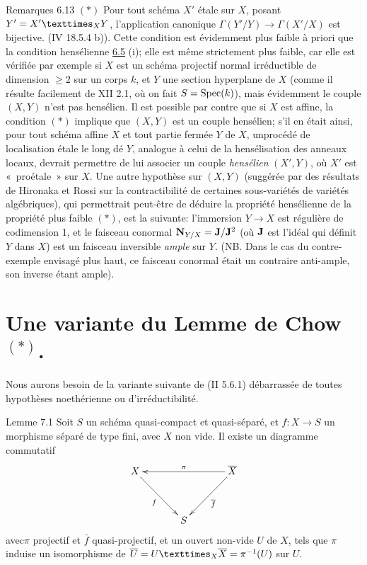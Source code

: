 \documentclass[10pt]{../fichiers-configuration-latex/smfart}
\begin{document}
\begin{enonce*}[remark]{Remarques 6.13}
$(\ast)$ Pour tout schéma $X'$ étale sur $X$, posant
$Y'=\fprod{X'}{Y}{X}$, l'application canonique
$\Gamma(Y'/Y)\rightarrow \Gamma(X'/X)$ est bijective.
(\Cf \EGA IV 18.5.4 b)). Cette condition est évidemment plus faible à
priori que la condition hensélienne \hyperref[XII.prop6.5]{6.5} (i); elle est même strictement
plus faible, car elle est vérifiée par exemple si $X$ est un schéma
projectif normal irréductible de dimension $\geq 2$ sur un corps $k$,
et $Y$ une section hyperplane de $X$ (comme il résulte facilement de
 XII 2.1, où on fait $S=\operatorname{Spec}(k)$), mais évidemment le couple
$(X,Y)$ n'est pas hensélien. Il est possible par contre que si $X$ est
affine, la condition $(\ast)$ implique que $(X,Y)$ est un couple
hensélien; s'il en était ainsi, pour tout schéma affine $X$ et tout
partie fermée $Y$ de $X$, un\pageoriginale procédé de localisation
étale le long dé $Y$, analogue à celui de la hensélisation des anneaux
locaux, devrait permettre de lui associer un couple \emph{hensélien}
$(X',Y)$, où $X'$ est « proétale »  sur $X$. Une autre hypothèse
sur $(X,Y)$ (suggérée par des résultats de Hironaka et Rossi sur la
contractibilité de certaines sous-variétés de variétés algébriques),
qui permettrait peut-être de déduire la propriété hensélienne de la
propriété plus faible $(\ast)$, est la suivante: l'immersion
$Y\rightarrow X$ est régulière de codimension 1, et le faisceau
conormal $\mathbf{N}_{Y/X}=\mathbf{J}/\mathbf{J}^2$ (où $\mathbf{J}$ est l'idéal qui définit $Y$
dans $X$) est un faisceau inversible \emph{ample} sur $Y$. (NB. Dans
le cas du contre-exemple envisagé plus haut, ce faisceau conormal
était un contraire anti-ample, \ie son inverse étant ample).
\end{enonce*}

\begin{NoHyper}
\end{NoHyper}
\section{Une variante du Lemme de Chow ${}^{(*)}$.}

Nous aurons besoin de la variante suivante de (\EGA II 5.6.1)
débarrassée de toutes hypothèses noethérienne ou d'irréductibilité.

\begin{enonce*}{Lemme 7.1}
Soit $S$ un schéma quasi-compact et quasi-séparé, et $f:X\rightarrow
S$ un morphisme séparé de type fini, avec $X$ non vide. Il existe un
diagramme commutatif
$$
\xymatrix@=1.25cm{
X \ar[rd]_{f}&    &\bar{X}\ar[ll]_{\pi}\ar[ld]^{\bar{f}}\\
  &  S & 
}
$$
avec\pageoriginale $\pi$ projectif et $\bar{f}$ quasi-projectif, et un
ouvert non-vide $U$ de $X$, tels que $\pi$ induise un isomorphisme de
$\bar{U}=\fprod{U}{\bar{X}}{X}=\pi^{-1}(U)$ sur $U$.
\end{enonce*}
\end{document}
